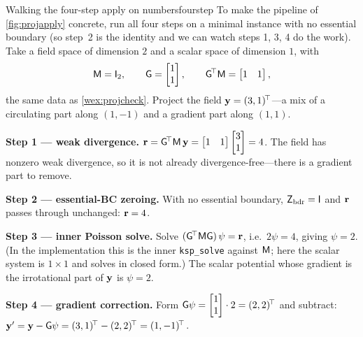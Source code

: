 \begin{workedexample}{Walking the four-step apply on numbers}{fourstep}
To make the pipeline of \cref{fig:projapply} concrete, run all four steps on a
minimal instance with no essential boundary (so step~2 is the identity and we can
watch steps 1, 3, 4 do the work). Take a field space of dimension $2$ and a scalar
space of dimension $1$, with
\[
  \mathsf{M} = \mathsf{I}_2,
  \qquad
  \mathsf{G} = \begin{bmatrix}1\\1\end{bmatrix},
  \qquad
  \mathsf{G}^{\!\top}\mathsf{M} = \begin{bmatrix}1 & 1\end{bmatrix},
\]
the same data as \cref{wex:projcheck}. Project the field
$\mathbf{y}=(3,1)^{\!\top}$---a mix of a circulating part along $(1,-1)$ and a gradient
part along $(1,1)$.

\medskip\noindent\textbf{Step 1 --- weak divergence.}
$\mathbf{r} = \mathsf{G}^{\!\top}\mathsf{M}\,\mathbf{y} = \begin{bmatrix}1&1\end{bmatrix}
\begin{bmatrix}3\\1\end{bmatrix} = 4$. The field has nonzero weak divergence, so it
is not already divergence-free---there is a gradient part to remove.

\medskip\noindent\textbf{Step 2 --- essential-BC zeroing.}
With no essential boundary, $\mathsf{Z}_{\mathrm{bdr}}=\mathsf{I}$ and $\mathbf{r}$ passes
through unchanged: $\mathbf{r} = 4$.

\medskip\noindent\textbf{Step 3 --- inner Poisson solve.}
Solve $(\mathsf{G}^{\!\top}\mathsf{M}\mathsf{G})\,\psi = \mathbf{r}$, i.e.\ $2\psi = 4$, giving
$\psi = 2$. (In the implementation this is the inner \texttt{ksp\_solve} against
$\mathsf{M}$; here the scalar system is $1\times1$ and solves in closed form.) The
scalar potential whose gradient is the irrotational part of $\mathbf{y}$ is $\psi=2$.

\medskip\noindent\textbf{Step 4 --- gradient correction.}
Form $\mathsf{G}\psi = \begin{bmatrix}1\\1\end{bmatrix}\cdot 2 = (2,2)^{\!\top}$ and
subtract: $\mathbf{y}' = \mathbf{y} - \mathsf{G}\psi = (3,1)^{\!\top} - (2,2)^{\!\top} =
(1,-1)^{\!\top}$.


\end{workedexample}
